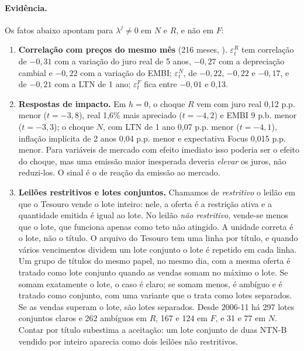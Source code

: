 \documentclass[12pt,a4paper]{article}
\begin{document}
\paragraph{Evidência.} Os fatos abaixo apontam para \(\lambda^j\neq 0\) em \(N\) e
\(R\), e não em \(F\):
\begin{enumerate}[leftmargin=1.2cm]
    \item \textbf{Correlação com preços do mesmo mês} (216 meses,
    ). \(\varepsilon_t^R\) tem correlação
    de \(-0{,}31\) com a variação do juro real de 5 anos, \(-0{,}27\) com a
    depreciação cambial e \(-0{,}22\) com a variação do EMBI; \(\varepsilon_t^N\),
    de \(-0{,}22\), \(-0{,}22\) e \(-0{,}17\), e de \(-0{,}21\) com a LTN de 1 ano;
    \(\varepsilon_t^F\) fica entre \(-0{,}01\) e 0,13.
    \item \textbf{Respostas de impacto.} Em \(h=0\), o choque \(R\) vem com juro real
    0,12 p.p. menor (\(t=-3{,}8\)), real 1,6\% mais apreciado (\(t=-4{,}2\)) e EMBI 9
    p.b. menor (\(t=-3{,}3\)); o choque \(N\), com LTN de 1 ano 0,07 p.p. menor
    (\(t=-4{,}1\)), inflação implícita de 2 anos 0,04 p.p. menor e expectativa Focus
    0,015 p.p. menor. Para variáveis de mercado com efeito imediato isso poderia
    ser o efeito do choque, mas uma emissão maior inesperada deveria \emph{elevar}
    os juros, não reduzi-los. O sinal é o de reação da emissão ao mercado.
    \item \textbf{Leilões restritivos e lotes conjuntos.} Chamamos de
    \emph{restritivo} o leilão em que o Tesouro vende o lote inteiro: nele, a oferta
    é a restrição ativa e a quantidade emitida é igual ao lote. No leilão \emph{não
    restritivo}, vende-se menos que o lote, que funciona apenas como teto não
    atingido. A unidade correta é o lote, não o título. O arquivo do Tesouro tem uma
    linha por título, e quando vários vencimentos dividem um lote conjunto o lote é
    repetido em cada linha. Um grupo de títulos do mesmo papel, no mesmo dia, com a
    mesma oferta é tratado como lote conjunto quando as vendas somam no máximo o
    lote. Se somam exatamente o lote, o caso é claro; se somam menos, é ambíguo e é
    tratado como conjunto, com uma variante que o trata como lotes separados. Se as
    vendas superam o lote, são lotes separados. Desde 2006-11 há 297 lotes conjuntos
    claros e 262 ambíguos em \(R\), 167 e 124 em \(F\), e 31 e 77 em \(N\). Contar por
    título subestima a aceitação: um lote conjunto de duas NTN-B vendido por inteiro
    aparecia como dois leilões não restritivos.


\end{enumerate}
\end{document}
